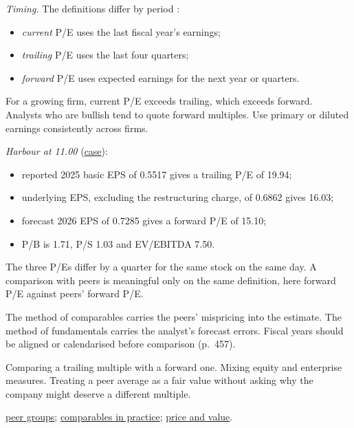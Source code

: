\begin{qfmethod}
\emph{Timing.} The definitions differ by period \citep[pp.~455--456, 468--469]{investment-valuation-2012}:
\begin{itemize}
\item \emph{current} P/E uses the last fiscal year's earnings;
\item \emph{trailing} P/E uses the last four quarters;
\item \emph{forward} P/E uses expected earnings for the next year or quarters.
\end{itemize}
For a growing firm, current P/E exceeds trailing, which exceeds forward. Analysts who are bullish tend to quote forward multiples. Use primary or diluted earnings consistently across firms.

 \emph{Harbour at 11.00} (\hyperref[ex:harbour-tools-statements]{case}):
\begin{itemize}
\item reported 2025 basic EPS of 0.5517 gives a trailing P/E of 19.94;
\item underlying EPS, excluding the restructuring charge, of 0.6862 gives 16.03;
\item forecast 2026 EPS of 0.7285 gives a forward P/E of 15.10;
\item P/B is 1.71, P/S 1.03 and EV/EBITDA 7.50.
\end{itemize}
The three P/Es differ by a quarter for the same stock on the same day. A comparison with peers is meaningful only on the same definition, here forward P/E against peers' forward P/E.

 The method of comparables carries the peers' mispricing into the estimate. The method of fundamentals carries the analyst's forecast errors. Fiscal years should be aligned or calendarised before comparison (p.~457).

 Comparing a trailing multiple with a forward one. Mixing equity and enterprise measures. Treating a peer average as a fair value without asking why the company might deserve a different multiple.

 \hyperref[meth:peer-group-selection]{peer groups}; \hyperref[meth:comparables-evaluation]{comparables in practice}; \hyperref[def:price-value-indicators]{price and value}.

\end{qfmethod}


